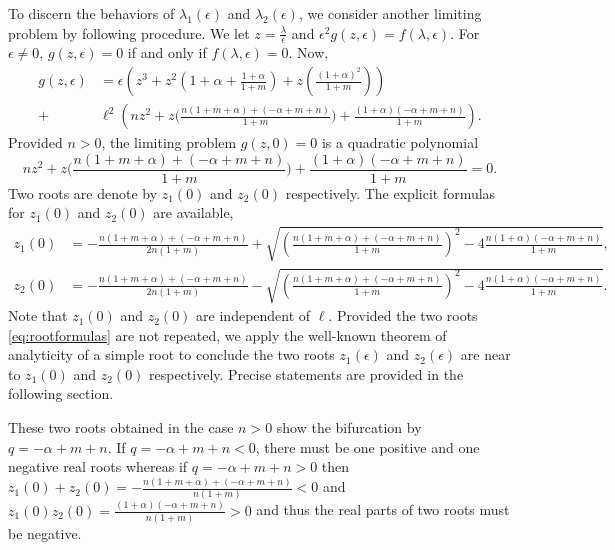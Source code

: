 \documentclass[a4paper,11pt]{article}
\def\l{{\ell}}
\theoremstyle{remark}
\begin{document}
{To discern the behaviors of $\lambda_1(\epsilon)$ and $\lambda_2(\epsilon)$, we consider another limiting problem by following procedure.
We let $z = \frac{\lambda}{\epsilon}$ and $\epsilon^2 g(z,\epsilon) =  f(\lambda, \epsilon)$. For $\epsilon\ne0$, $g(z,\epsilon)=0$ if and only if $f(\lambda,\epsilon)=0$. Now,
\begin{align}
 g(z,\epsilon) &= \epsilon\left( z^3 + z^2\left(1+\alpha + \tfrac{1+\alpha}{1+m}\right) + z\left(\tfrac{(1+\alpha)^2}{1+m}\right)\right) \nonumber\\
 +& \l^2\left(nz^2 + z\Big( \tfrac{n(1+m+\alpha) + (-\alpha+m+n)}{1+m}\Big) + \tfrac{(1+\alpha)(-\alpha+m+n)}{1+m}  \right). \label{eq:reduced_poly}
\end{align}
Provided $n>0$, the limiting problem $g(z,0)=0$ is a quadratic polynomial
\begin{equation}
nz^2 + z\Big( \frac{n(1+m+\alpha) + (-\alpha+m+n)}{1+m}\Big) + \frac{(1+\alpha)(-\alpha+m+n)}{1+m} =0. \label{eq:auxquad}
\end{equation}
Two roots are  denote by $z_1(0)$ and $z_2(0)$ respectively.  The explicit formulas for $z_1(0)$ and $z_2(0)$ are available,
\begin{equation}\label{eq:rootformulas}
\begin{aligned}
 z_1(0) &= -\tfrac{n(1+m+\alpha) + (-\alpha+m+n)}{2n(1+m)} + \sqrt{\left(\tfrac{n(1+m+\alpha) + (-\alpha+m+n)}{1+m}\right)^2 -4 \tfrac{n(1+\alpha)(-\alpha+m+n)}{1+m}},\\
z_2(0) &= -\tfrac{n(1+m+\alpha) + (-\alpha+m+n)}{2n(1+m)}  - \sqrt{\left(\tfrac{n(1+m+\alpha) + (-\alpha+m+n)}{1+m}\right)^2 -4 \tfrac{n(1+\alpha)(-\alpha+m+n)}{1+m}}.
\end{aligned}
\end{equation}
Note that $z_1(0)$ and $z_2(0)$ are independent of $\ell$. Provided the two roots  \eqref{eq:rootformulas} are not repeated, we apply the well-known theorem of analyticity of a simple root to conclude the two roots $z_1(\epsilon)$ and $z_2(\epsilon)$ are near to $z_1(0)$ and $z_2(0)$ respectively. Precise statements are provided in the following section.

These two roots obtained in the case $n>0$ show the bifurcation by $q=-\alpha+m+n$. If $q=-\alpha+m+n<0$, there must be one positive and one negative real roots whereas if $q=-\alpha+m+n>0$ then $z_1(0)+z_2(0) = -\frac{n(1+m+\alpha) + (-\alpha+m+n)}{n(1+m)} < 0$ and $z_1(0)z_2(0)=\frac{(1+\alpha)(-\alpha+m+n)}{n(1+m)}>0$ and thus the real parts of two roots must be negative.




}
\end{document}
